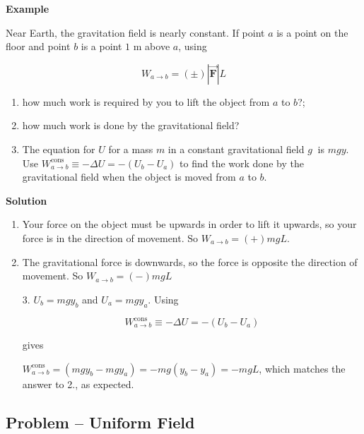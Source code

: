 \documentclass{article}
\newcommand{\bfvec}[1]{\vec{\mathbf{#1}}}
\begin{document}
\textbf{Example}

Near Earth, the gravitation field is nearly constant. If point $a$ is a point on the floor and point $b$ is a point $1\text{ m}$ above $a$, using

$$W_{a\rightarrow b}=(\pm)|\bfvec{F}|L$$

\begin{enumerate}

  \item how much work is required by you to lift the object from $a$ to $b$?;

  \item how much work is done by the gravitational field?

  \item The equation for $U$ for a mass $m$ in a constant gravitational field $g~$ is $mgy$. Use $W_{a\rightarrow b}^{\text{cons}} \equiv -\Delta U = -(U_b-U_a)$ to find the work done by the gravitational field when the object is moved from $a$ to $b$.

\end{enumerate}

\textbf{Solution}

\begin{enumerate}

  \item Your force on the object must be upwards in order to lift it upwards, so your force is in the direction of movement. So $W_{a\rightarrow b}=(+)mgL$.

  \item The gravitational force is downwards, so the force is opposite the direction of movement. So $W_{a\rightarrow b}=(-)mgL$

\end{enumerate}

\begin{enumerate}

  \item[3.] $U_b=mgy_b$ and $U_a=mgy_a$. Using

            $$W_{a\rightarrow b}^{\text{cons}} \equiv -\Delta U = -(U_b-U_a)$$

            gives

            $W_{a\rightarrow b}^{\text{cons}} = (mgy_b-mgy_a) = -mg(y_b-y_a) = -mgL$, which matches the answer to 2., as expected.

\end{enumerate}

\newpage

\subsection{Problem -- Uniform Field}
\end{document}
